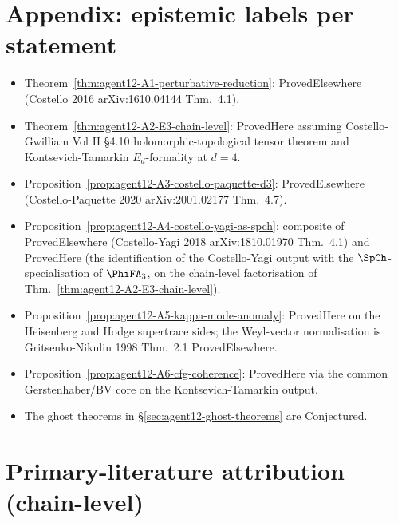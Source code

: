 \section*{Appendix: epistemic labels per statement}

\begin{itemize}
\item Theorem~\ref{thm:agent12-A1-perturbative-reduction}: ProvedElsewhere
(Costello 2016 arXiv:1610.04144 Thm.~4.1).
\item Theorem~\ref{thm:agent12-A2-E3-chain-level}: ProvedHere assuming
Costello-Gwilliam Vol II \S4.10 holomorphic-topological tensor theorem
and Kontsevich-Tamarkin $E_d$-formality at $d = 4$.
\item Proposition~\ref{prop:agent12-A3-costello-paquette-d3}: ProvedElsewhere
(Costello-Paquette 2020 arXiv:2001.02177 Thm.~4.7).
\item Proposition~\ref{prop:agent12-A4-costello-yagi-as-spch}: composite
of ProvedElsewhere (Costello-Yagi 2018 arXiv:1810.01970 Thm.~4.1) and
ProvedHere (the identification of the Costello-Yagi output with the
$\SpCh$-specialisation of $\PhiFA_3$, on the chain-level factorisation
of Thm.~\ref{thm:agent12-A2-E3-chain-level}).
\item Proposition~\ref{prop:agent12-A5-kappa-mode-anomaly}: ProvedHere
on the Heisenberg and Hodge supertrace sides; the Weyl-vector
normalisation is Gritsenko-Nikulin 1998 Thm.~2.1 ProvedElsewhere.
\item Proposition~\ref{prop:agent12-A6-cfg-coherence}: ProvedHere via
the common Gerstenhaber/BV core on the Kontsevich-Tamarkin output.

\item The ghost theorems in
\S\ref{sec:agent12-ghost-theorems} are Conjectured.
\end{itemize}

\section*{Primary-literature attribution (chain-level)}

